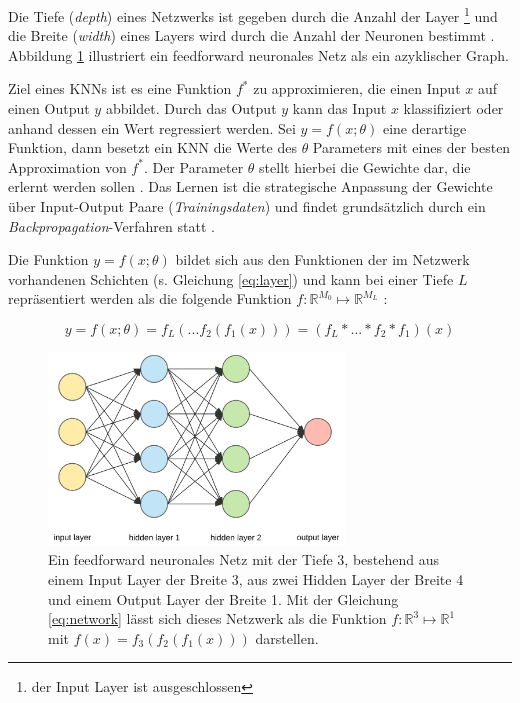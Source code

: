 Die Tiefe (\textit{depth}) eines Netzwerks ist gegeben durch die Anzahl der Layer \footnote{der Input Layer ist ausgeschlossen} und die Breite (\textit{width}) eines Layers wird durch die Anzahl der Neuronen bestimmt \cite{goodfellowDeepLearning2016}. 
Abbildung \ref{fig:neural_net} illustriert ein feedforward neuronales Netz als ein azyklischer Graph.

Ziel eines KNNs ist es eine Funktion $f^*$ zu approximieren, die einen Input $x$ auf einen Output $y$ abbildet. Durch das Output $y$ kann das Input $x$ klassifiziert oder anhand dessen ein Wert regressiert werden. Sei $y = f(x; \theta)$ eine derartige Funktion, dann besetzt ein KNN die Werte des $\theta$ Parameters mit eines der besten Approximation von $f^*$. Der Parameter $\theta$ stellt hierbei die Gewichte dar, die erlernt werden sollen \cite{goodfellowDeepLearning2016}. 
Das Lernen ist die strategische Anpassung der Gewichte über Input-Output Paare (\textit{Trainingsdaten}) und findet grundsätzlich durch ein \textit{Backpropagation}-Verfahren statt \cite{goodfellowDeepLearning2016}. 

Die Funktion $y = f(x; \theta)$ bildet sich aus den Funktionen der im Netzwerk vorhandenen Schichten (s. Gleichung \ref{eq:layer}) und kann bei einer Tiefe $L$ repräsentiert werden als die folgende Funktion $f :  \mathbb{R}^{M_0} \mapsto \mathbb{R}^{M_L}$ \cite{goodfellowDeepLearning2016, bauckhageInformedMachineLearning}:
 
\begin{equation}
\label{eq:network}
y = f(x; \theta)=  f_L(...f_2(f_1(x))) = (f_L * ... * f_2 * f_1)(x)
\end{equation}


\begin{figure}
	\centering
	\includegraphics[width=0.7\textwidth]{images/ann_conv/neural_net.png}
	\caption{Ein feedforward neuronales Netz mit der Tiefe 3, bestehend aus einem Input Layer der Breite 3, aus zwei Hidden Layer der Breite 4 und einem Output Layer der Breite 1. Mit der Gleichung \ref{eq:network} lässt sich dieses Netzwerk als die Funktion $f :  \mathbb{R}^{3} \mapsto \mathbb{R}^{1}$ mit $f(x)=f_3(f_2(f_1(x)))$ darstellen. }
	\label{fig:neural_net}
\end{figure}

